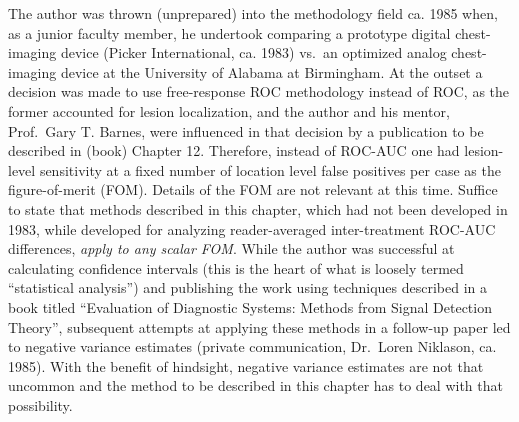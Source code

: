 \documentclass[
]{book}
\begin{document}
The author was thrown (unprepared) into the methodology field ca. 1985 when, as a junior faculty member, he undertook comparing a prototype digital chest-imaging device (Picker International, ca. 1983) vs.~an optimized analog chest-imaging device at the University of Alabama at Birmingham. At the outset a decision was made to use free-response ROC methodology instead of ROC, as the former accounted for lesion localization, and the author and his mentor, Prof.~Gary T. Barnes, were influenced in that decision by a publication \citep{RN2453} to be described in (book) Chapter 12. Therefore, instead of ROC-AUC one had lesion-level sensitivity at a fixed number of location level false positives per case as the figure-of-merit (FOM). Details of the FOM are not relevant at this time. Suffice to state that methods described in this chapter, which had not been developed in 1983, while developed for analyzing reader-averaged inter-treatment ROC-AUC differences, \emph{apply to any scalar FOM}. While the author was successful at calculating confidence intervals (this is the heart of what is loosely termed ``statistical analysis'') and publishing the work \citep{RN621} using techniques described in a book \citep{RN412} titled ``Evaluation of Diagnostic Systems: Methods from Signal Detection Theory'', subsequent attempts at applying these methods in a follow-up paper \citep{RN620} led to negative variance estimates (private communication, Dr.~Loren Niklason, ca. 1985). With the benefit of hindsight, negative variance estimates are not that uncommon and the method to be described in this chapter has to deal with that possibility.
\end{document}
